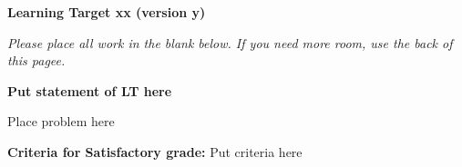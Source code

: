 \documentclass[10pt]{article}
\begin{document}
	\vspace*{0in}

		\begin{center}
			\textbf{Learning Target xx (version y)} \\
		\end{center}

\emph{Please place all work in the blank below. If you need more room, use the back of this pagee.}

\begin{framed}
	\textbf{Put statement of LT here }
\end{framed}

Place problem here

\vfill


\begin{small}
    \begin{framed}
        	\textbf{Criteria for Satisfactory grade:} Put criteria here 
    \end{framed}

\end{small}
\end{document}
